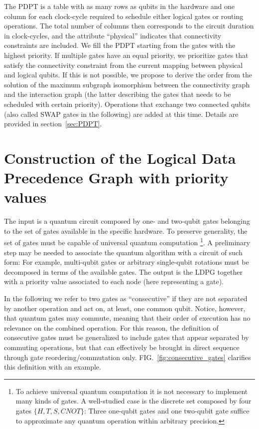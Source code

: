 \documentclass[%
onecolumn,pra,
superscriptaddress,
nofootinbib,
 amsmath,amssymb,
 aps,
11pt,
]{revtex4-1}
\begin{document}
The PDPT is a table with as many rows as qubits in the hardware and one column for each clock-cycle required to schedule either logical gates or routing operations. The total number of columns then corresponds to the circuit duration in clock-cycles, and the attribute ``physical'' indicates that connectivity constraints are included. We fill the PDPT starting from the gates with the highest priority. If multiple gates have an equal priority, we prioritize gates that satisfy the connectivity constraint from the current mapping between physical and logical qubits. If this is not possible, we propose to derive the order from the solution of the maximum subgraph isomorphism between the connectivity graph and the interaction graph (the latter describing the gates that needs to be scheduled with certain priority). Operations that exchange two connected qubits (also called SWAP gates in the following) are added at this time. Details are provided in section~\ref{sec:PDPT}.



\section{Construction of the Logical Data Precedence Graph with priority values}
\label{sec:LDPG}

The input is a quantum circuit composed by one- and two-qubit gates belonging to the set of gates available in the specific hardware. To preserve generality, the set of gates must be capable of universal quantum computation%
\footnote{To achieve universal quantum computation it is not necessary to implement many kinds of gates. A well-studied case is the discrete set composed by four gates $\{H,T,S,CNOT\}$: Three one-qubit gates and one two-qubit gate suffice to approximate any quantum operation within arbitrary precision.}.
A preliminary step may be needed to associate the quantum algorithm with a circuit of such form: For example, multi-qubit gates or arbitrary single-qubit rotations must be decomposed in terms of the available gates.
The output is the LDPG together with a priority value associated to each node (here representing a gate).

In the following we refer to two gates as ``consecutive'' if they are not separated by another operation and act on, at least, one common qubit. Notice, however, that quantum gates may commute, meaning that their order of execution has no relevance on the combined operation. For this reason, the definition of consecutive gates must be generalized to include gates that appear separated by commuting operations, but that can effectively be brought in direct sequence through gate reordering/commutation only. FIG.~\ref{fig:consecutive_gates} clarifies this definition with an example.
\end{document}

